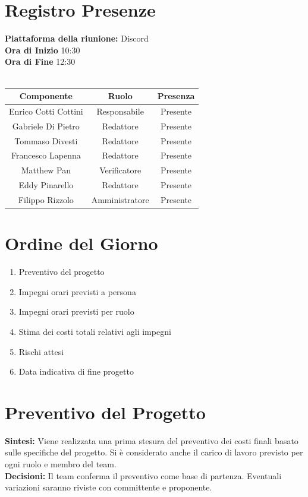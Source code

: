 \documentclass{article}
\begin{document}
\section{Registro Presenze}
\textbf{Piattaforma della riunione:} Discord \\
\textbf{Ora di Inizio} 10:30\\
\textbf{Ora di Fine} 12:30\\
\\
\begin{tabular}{|c|c|c|}
    \hline
    \textbf{Componente} & \textbf{Ruolo} & \textbf{Presenza}\\
    \hline
    Enrico Cotti Cottini & Responsabile& Presente \\ 
    \hline
    Gabriele Di Pietro & Redattore & Presente\\ 
    \hline
    Tommaso Divesti & Redattore & Presente \\ 
    \hline 
    Francesco Lapenna & Redattore& Presente \\ 
    \hline
    Matthew Pan & Verificatore & Presente\\ 
    \hline 
    Eddy Pinarello & Redattore & Presente \\ 
    \hline 
    Filippo Rizzolo & Amministratore& Presente \\ 
    \hline 
\end{tabular}

\newpage
\section*{Ordine del Giorno}
\begin{enumerate}
    \item Preventivo del progetto
    \item Impegni orari previsti a persona
    \item Impegni orari previsti per ruolo
    \item Stima dei costi totali relativi agli impegni
    \item Rischi attesi
    \item Data indicativa di fine progetto
\end{enumerate}

\section{Preventivo del Progetto}
\textbf{Sintesi:} Viene realizzata una prima stesura del preventivo dei costi finali basato sulle specifiche del progetto. Si è considerato anche il carico di lavoro previsto per ogni ruolo e membro del team. \\
\textbf{Decisioni:} Il team conferma il preventivo come base di partenza. Eventuali variazioni saranno riviste con committente e proponente.
\end{document}
